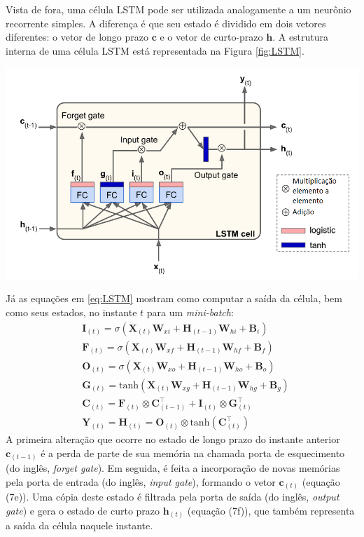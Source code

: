 \documentclass[a4paper]{article}
\newenvironment{Figure}
  {\vspace{0pt}\noindent\minipage{\linewidth}}
  {\endminipage\vspace{5pt}}
\begin{document}
\begin{multicols}{2}
Vista de fora, uma célula LSTM pode ser utilizada analogamente a um neurônio recorrente simples. A diferença é que seu estado é dividido em dois vetores diferentes: o vetor de longo prazo $\mathbf{c}$ e o vetor de curto-prazo $\mathbf{h}$. A estrutura interna de uma célula LSTM está representada na Figura \ref{fig:LSTM}.

\begin{Figure}
\centering
\includegraphics[width=\linewidth]{LSTM.png}
\label{fig:LSTM}
\end{Figure}

Já as equações em \eqref{eq:LSTM} mostram como computar a saída da célula, bem como seus estados, no instante $t$ para um \textit{mini-batch}:
\begin{subequations}
\begin{align}
&\mathbf{I}_{(t)} = \sigma(\mathbf{X}_{(t)}\mathbf{W}_{xi} + \mathbf{H}_{(t-1)}\mathbf{W}_{hi} + \mathbf{B}_i) \\
&\mathbf{F}_{(t)} = \sigma(\mathbf{X}_{(t)}\mathbf{W}_{xf} + \mathbf{H}_{(t-1)}\mathbf{W}_{hf} + \mathbf{B}_f) \\
&\mathbf{O}_{(t)} = \sigma(\mathbf{X}_{(t)}\mathbf{W}_{xo} + \mathbf{H}_{(t-1)}\mathbf{W}_{ho} + \mathbf{B}_o) \\
&\mathbf{G}_{(t)} = \text{tanh}(\mathbf{X}_{(t)}\mathbf{W}_{xg} + \mathbf{H}_{(t-1)}\mathbf{W}_{hg} + \mathbf{B}_g) \\
&\mathbf{C}_{(t)} = \mathbf{F}_{(t)} \otimes \mathbf{C}_{(t-1)}^{\top} + \mathbf{I}_{(t)} \otimes \mathbf{G}_{(t)}^{\top} \\
&\mathbf{Y}_{(t)} = \mathbf{H}_{(t)} = \mathbf{O}_{(t)} \otimes \text{tanh} (\mathbf{C}_{(t)}^{\top})
\end{align}
\label{eq:LSTM}
\end{subequations}
A primeira alteração que ocorre no estado de longo prazo do instante anterior $\mathbf{c}_{(t-1)}$ é a perda de parte de sua memória na chamada porta de esquecimento (do inglês, \emph{forget gate}). Em seguida, é feita a incorporação de novas memórias pela porta de entrada (do inglês, \emph{input gate}), formando o vetor $\mathbf{c}_{(t)}$ (equação (7e)).
Uma cópia deste estado é filtrada pela porta de saída (do inglês, \emph{output gate}) e gera o estado de curto prazo $\mathbf{h}_{(t)}$ (equação (7f)), que também representa a saída da célula naquele instante. 


\end{multicols}
\end{document}
